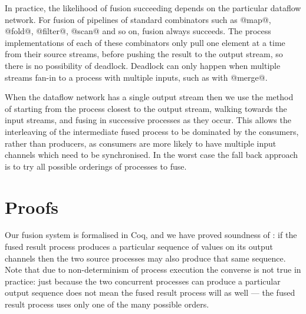 
In practice, the likelihood of fusion succeeding depends on the particular dataflow network. For fusion of pipelines of standard combinators such as @map@, @fold@, @filter@, @scan@ and so on, fusion always succeeds. The process implementations of each of these combinators only pull one element at a time from their source streams, before pushing the result to the output stream, so there is no possibility of deadlock. Deadlock can only happen when multiple streams fan-in to a process with multiple inputs, such as with @merge@.

When the dataflow network has a single output stream then we use the method of starting from the process closest to the output stream, walking towards the input streams, and fusing in successive processes as they occur. This allows the interleaving of the intermediate fused process to be dominated by the consumers, rather than producers, as consumers are more likely to have multiple input channels which need to be synchronised. In the worst case the fall back approach is to try all possible orderings of processes to fuse.





\section{Proofs}
\label{s:Proofs}

Our fusion system is formalised in Coq, and we have proved soundness of : if the fused result process produces a particular sequence of values on its output channels then the two source processes may also produce that same sequence. Note that due to non-determinism of process execution the converse is not true in practice: just because the two concurrent processes can produce a particular output sequence does not mean the fused result process will as well --- the fused result process uses only one of the many possible orders.

